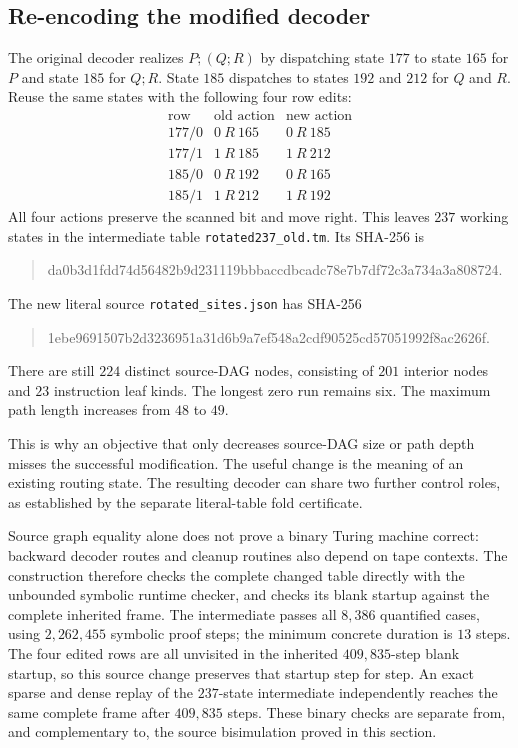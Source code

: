\subsection{Re-encoding the modified decoder}

The original decoder realizes $P;(Q;R)$ by dispatching state $177$ to state $165$
for $P$ and state $185$ for $Q;R$.  State $185$ dispatches to states $192$ and $212$
for $Q$ and $R$.  Reuse the same states with the following four row edits:
\[
 \begin{array}{c|c|c}
 \text{row}&\text{old action}&\text{new action}\\ \hline
 177/0&0\ R\ 165&0\ R\ 185\\
 177/1&1\ R\ 185&1\ R\ 212\\
 185/0&0\ R\ 192&0\ R\ 165\\
 185/1&1\ R\ 212&1\ R\ 192
 \end{array}
\]
All four actions preserve the scanned bit and move right.  This leaves $237$
working states in the intermediate table \texttt{rotated237\_old.tm}.  Its SHA-256
is
\begin{quote}\small\ttfamily
 da0b3d1fdd74d56482b9d231119bbbaccdbcadc78e7b7df72c3a734a3a808724.
\end{quote}
The new literal source \texttt{rotated\_sites.json} has SHA-256
\begin{quote}\small\ttfamily
 1ebe9691507b2d3236951a31d6b9a7ef548a2cdf90525cd57051992f8ac2626f.
\end{quote}
There are still $224$ distinct source-DAG nodes, consisting of $201$ interior
nodes and $23$ instruction leaf kinds.  The longest zero run remains six.
The maximum path length increases from $48$ to $49$.

This is why an objective that only decreases source-DAG size or path depth misses
the successful modification.  The useful change is the meaning of an existing
routing state.  The resulting decoder can share two further control roles, as
established by the separate literal-table fold certificate.

Source graph equality alone does not prove a binary Turing machine correct:
backward decoder routes and cleanup routines also depend on tape contexts.
The construction therefore checks the complete changed table directly with the
unbounded symbolic runtime checker, and checks its blank startup against the
complete inherited frame.  The intermediate passes all $8{,}386$ quantified
cases, using $2{,}262{,}455$ symbolic proof steps; the minimum concrete duration
is $13$ steps.  The four edited rows are all unvisited in the inherited $409{,}835$-step
blank startup, so this source change preserves that startup step for step.
An exact sparse and dense replay of the $237$-state intermediate independently
reaches the same complete frame after $409{,}835$ steps.  These binary
checks are separate from, and complementary to, the source bisimulation proved
in this section.

